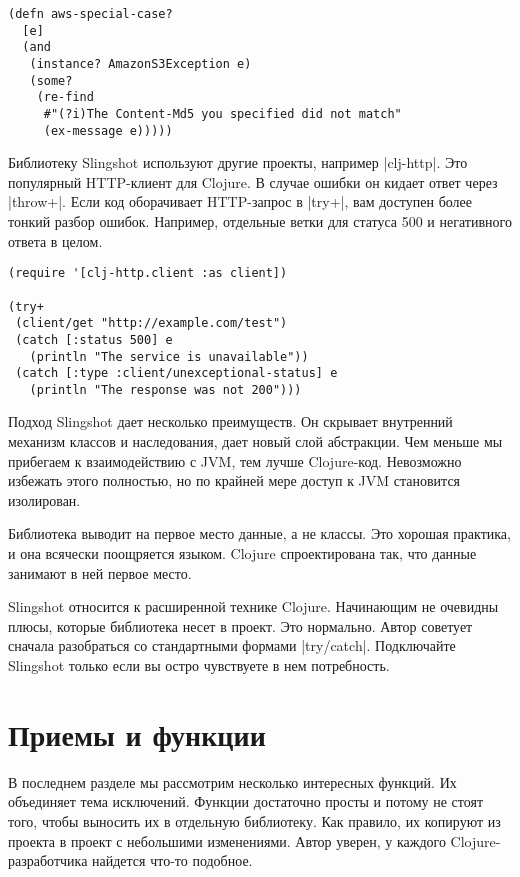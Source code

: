 \begin{verbatim}
(defn aws-special-case?
  [e]
  (and
   (instance? AmazonS3Exception e)
   (some?
    (re-find
     #"(?i)The Content-Md5 you specified did not match"
     (ex-message e)))))
\end{verbatim}

Библиотеку Slingshot используют другие проекты, например \spverb|clj-http|. Это
популярный HTTP-клиент для Clojure. В случае ошибки он кидает ответ через
\spverb|throw+|. Если код оборачивает HTTP-запрос в \spverb|try+|, вам доступен более тонкий
разбор ошибок. Например, отдельные ветки для статуса 500 и негативного ответа в
целом.

\begin{verbatim}
(require '[clj-http.client :as client])

(try+
 (client/get "http://example.com/test")
 (catch [:status 500] e
   (println "The service is unavailable"))
 (catch [:type :client/unexceptional-status] e
   (println "The response was not 200")))
\end{verbatim}

Подход Slingshot дает несколько преимуществ. Он скрывает внутренний механизм
классов и наследования, дает новый слой абстракции. Чем меньше мы прибегаем к
взаимодействию с JVM, тем лучше Clojure-код. Невозможно избежать этого
полностью, но по крайней мере доступ к JVM становится изолирован.

Библиотека выводит на первое место данные, а не классы. Это хорошая практика, и
она всячески поощряется языком. Clojure спроектирована так, что данные занимают
в ней первое место.

Slingshot относится к расширенной технике Clojure. Начинающим не очевидны плюсы,
которые библиотека несет в проект. Это нормально. Автор советует сначала
разобраться со стандартными формами \spverb|try/catch|. Подключайте Slingshot только
если вы остро чувствуете в нем потребность.

\section{Приемы и функции}

В последнем разделе мы рассмотрим несколько интересных функций. Их объединяет
тема исключений. Функции достаточно просты и потому не стоят того, чтобы
выносить их в отдельную библиотеку. Как правило, их копируют из проекта в проект
с небольшими изменениями. Автор уверен, у каждого Clojure-разработчика найдется
что-то подобное.

